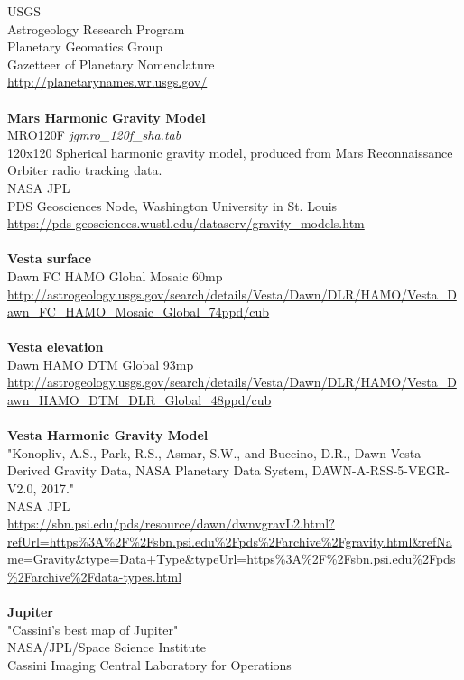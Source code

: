 \documentclass[Orbiter User Manual.tex]{subfiles}
\begin{document}
USGS\\
Astrogeology Research Program\\
Planetary Geomatics Group\\
Gazetteer of Planetary Nomenclature\\
\url{http://planetarynames.wr.usgs.gov/}\\
\\
\textbf{Mars Harmonic Gravity Model}\\
MRO120F	\textit{jgmro\_120f\_sha.tab}\\
120x120 Spherical harmonic gravity model, produced from Mars Reconnaissance Orbiter radio tracking data.\\
NASA JPL\\
PDS Geosciences Node, Washington University in St. Louis\\
\url{https://pds-geosciences.wustl.edu/dataserv/gravity_models.htm}\\
\\
\textbf{Vesta surface}\\
Dawn FC HAMO Global Mosaic 60mp\\
\url{http://astrogeology.usgs.gov/search/details/Vesta/Dawn/DLR/HAMO/Vesta_Dawn_FC_HAMO_Mosaic_Global_74ppd/cub}\\
\\
\textbf{Vesta elevation}\\
Dawn HAMO DTM Global 93mp\\
\url{http://astrogeology.usgs.gov/search/details/Vesta/Dawn/DLR/HAMO/Vesta_Dawn_HAMO_DTM_DLR_Global_48ppd/cub}\\
\\
\textbf{Vesta Harmonic Gravity Model}\\
"Konopliv, A.S., Park, R.S., Asmar, S.W., and Buccino, D.R., Dawn Vesta Derived Gravity Data, NASA Planetary Data System, DAWN-A-RSS-5-VEGR-V2.0, 2017."\\
NASA JPL\\
\url{https://sbn.psi.edu/pds/resource/dawn/dwnvgravL2.html?refUrl=https\%3A\%2F\%2Fsbn.psi.edu\%2Fpds\%2Farchive\%2Fgravity.html&refName=Gravity&type=Data+Type&typeUrl=https\%3A\%2F\%2Fsbn.psi.edu\%2Fpds\%2Farchive\%2Fdata-types.html}\\
\\
\textbf{Jupiter}\\
"Cassini's best map of Jupiter"\\
NASA/JPL/Space Science Institute\\
Cassini Imaging Central Laboratory for Operations\\
\end{document}
